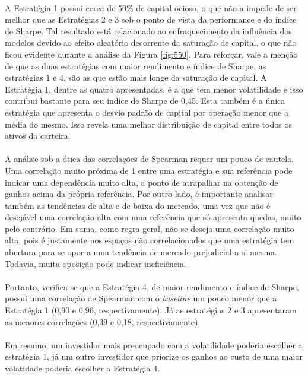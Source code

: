 \paragraph{} A Estratégia 1 possui cerca de 50\% de capital ocioso, o que não a impede de ser melhor que as Estratégias 2 e 3 sob o ponto de vista da performance e do índice de Sharpe. Tal resultado está relacionado ao enfraquecimento da influência dos modelos devido ao efeito aleatório decorrente da saturação de capital, o que não ficou evidente durante a análise da Figura \ref{fig:550}. Para reforçar, vale a menção de que as duas estratégias com maior rendimento e índice de Sharpe, as estratégias 1 e 4, são as que estão mais longe da saturação de capital. A Estratégia 1, dentre as quatro apresentadas, é a que tem menor volatilidade e isso contribui bastante para seu índice de Sharpe de 0,45. Esta também é a única estratégia que apresenta o desvio padrão de capital por operação menor que a média do mesmo. Isso revela uma melhor distribuição de capital entre todos os ativos da carteira.

\paragraph{} A análise sob a ótica das correlações de Spearman requer um pouco de cautela. Uma correlação muito próxima de 1 entre uma estratégia e sua referência pode indicar uma dependência muito alta, a ponto de atrapalhar na obtenção de ganhos acima da própria referência. Por outro lado, é importante analisar também as tendências de alta e de baixa do mercado, uma vez que não é desejável uma correlação alta com uma referência que só apresenta quedas, muito pelo contrário. Em suma, como regra geral, não se deseja uma correlação muito alta, pois é justamente nos espaços não correlacionados que uma estratégia tem abertura para se opor a uma tendência de mercado prejudicial a si mesma. Todavia, muita oposição pode indicar ineficiência.

\paragraph{} Portanto, verifica-se que a Estratégia 4, de maior rendimento e índice de Sharpe, possui uma correlação de Spearman com o \textit{baseline} um pouco menor que a Estratégia 1 (0,90 e 0,96, respectivamente). Já as estratégias 2 e 3 apresentaram as menores correlações (0,39 e 0,18, respectivamente).

\paragraph{} Em resumo, um investidor mais preocupado com a volatilidade poderia escolher a estratégia 1, já um outro investidor que priorize os ganhos ao custo de uma maior volatidade poderia escolher a Estratégia 4.
